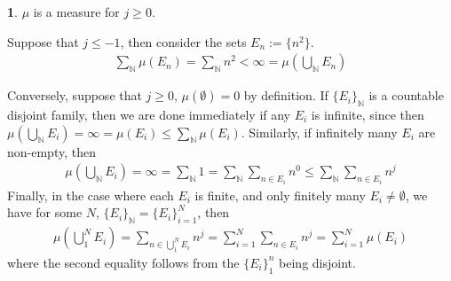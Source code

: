 \documentclass[10.5pt]{article}
\theoremstyle{definition}
\newtheorem{pb}{}
\newcommand{\set}[1]{\{#1\}}
\begin{document}
	\begin{pb}
		\(\mu\) is a measure for \(j \geq 0\).

		Suppose that \(j \leq -1\), then consider the sets \(E_n := \set{n^2}\).
        \begin{align*}\sum_\mathbb{N} \mu(E_n) = \sum_\mathbb{N} n^2 < \infty = \mu\left(\bigcup_\mathbb{N} E_n\right)\end{align*}

        Conversely, suppose that \(j \geq 0\), \(\mu(\emptyset) = 0\) by definition. If \(\set{E_i}_\mathbb{N}\) is a countable disjoint family,
        then we are done immediately if any \(E_i\) is infinite, since then \(\mu\left(\bigcup_\mathbb{N}E_i\right) = \infty = \mu(E_i) \leq \sum_\mathbb{N} \mu(E_i)\).
        Similarly, if infinitely many \(E_i\) are non-empty, then
        \begin{align*}
           \mu\left(\bigcup_\mathbb{N}E_i\right) = \infty = \sum_\mathbb{N} 1 = \sum_{\mathbb{N}} \sum_{n \in E_i} n^0 \leq \sum_{\mathbb{N}} \sum_{n \in E_i} n^j
        \end{align*}
        Finally, in the case where each \(E_i \) is finite, and only finitely many \(E_i \neq \emptyset\), we have for some \(N\), \(\set{E_i}_\mathbb{N} = \set{E_i}_{i=1}^N\), then
        \begin{align*}
            \mu\left(\bigcup_1^N E_i\right) = \sum_{n \in \bigcup_1^N E_i} n^j = \sum_{i =1}^N \sum_{n\in E_i} n^j = \sum_{i=1}^N \mu(E_i)
        \end{align*}
        where the second equality follows from the \(\set{E_i}_1^n\) being disjoint.
	\end{pb}
\end{document}
